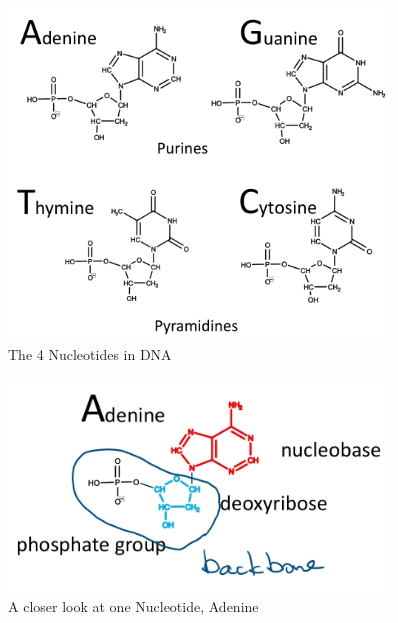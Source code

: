 \documentclass[]{article}
\begin{document}
\begin{figure}[H]
	\caption{The 4 Nucleotides in DNA}\label{fig:Nucleotides} 
	\includegraphics[width=0.9\textwidth]{Nucleotides}
\end{figure}

\begin{figure}[H]
	\caption{A closer look at one Nucleotide, Adenine}\label{fig:NucleotideAdenine} 
	\includegraphics[width=0.9\textwidth]{NucleotideAdenine}
\end{figure}
\end{document}
